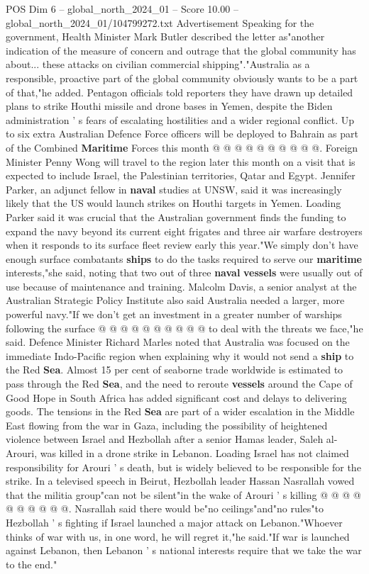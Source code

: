 \begin{textsample}{POS Dim 6 – global\_north\_2024\_01 – Score 10.00 – global\_north\_2024\_01/104799272.txt}
Advertisement Speaking for the government, Health Minister Mark Butler described the letter as"another indication of the measure of concern and outrage that the global community has about... these attacks on civilian commercial shipping"."Australia as a responsible, proactive part of the global community obviously wants to be a part of that,"he added.
Pentagon officials told reporters they have drawn up detailed plans to strike Houthi missile and drone bases in Yemen, despite the Biden administration ' s fears of escalating hostilities and a wider regional conflict.
Up to six extra Australian Defence Force officers will be deployed to Bahrain as part of the Combined \textbf{Maritime} Forces this month @ @ @ @ @ @ @ @ @ @.
Foreign Minister Penny Wong will travel to the region later this month on a visit that is expected to include Israel, the Palestinian territories, Qatar and Egypt.
Jennifer Parker, an adjunct fellow in \textbf{naval} studies at UNSW, said it was increasingly likely that the US would launch strikes on Houthi targets in Yemen.
Loading Parker said it was crucial that the Australian government finds the funding to expand the navy beyond its current eight frigates and three air warfare destroyers when it responds to its surface fleet review early this year."We simply don't have enough surface combatants \textbf{ships} to do the tasks required to serve our \textbf{maritime} interests,"she said, noting that two out of three \textbf{naval} \textbf{vessels} were usually out of use because of maintenance and training.
Malcolm Davis, a senior analyst at the Australian Strategic Policy Institute also said Australia needed a larger, more powerful navy."If we don't get an investment in a greater number of warships following the surface @ @ @ @ @ @ @ @ @ @ to deal with the threats we face,"he said.
Defence Minister Richard Marles noted that Australia was focused on the immediate Indo-Pacific region when explaining why it would not send a \textbf{ship} to the Red \textbf{Sea}.
Almost 15 per cent of seaborne trade worldwide is estimated to pass through the Red \textbf{Sea}, and the need to reroute \textbf{vessels} around the Cape of Good Hope in South Africa has added significant cost and delays to delivering goods.
The tensions in the Red \textbf{Sea} are part of a wider escalation in the Middle East flowing from the war in Gaza, including the possibility of heightened violence between Israel and Hezbollah after a senior Hamas leader, Saleh al-Arouri, was killed in a drone strike in Lebanon.
Loading Israel has not claimed responsibility for Arouri ' s death, but is widely believed to be responsible for the strike.
In a televised speech in Beirut, Hezbollah leader Hassan Nasrallah vowed that the militia group"can not be silent"in the wake of Arouri ' s killing @ @ @ @ @ @ @ @ @ @.
Nasrallah said there would be"no ceilings"and"no rules"to Hezbollah ' s fighting if Israel launched a major attack on Lebanon."Whoever thinks of war with us, in one word, he will regret it,"he said."If war is launched against Lebanon, then Lebanon ' s national interests require that we take the war to the end."

\end{textsample}
